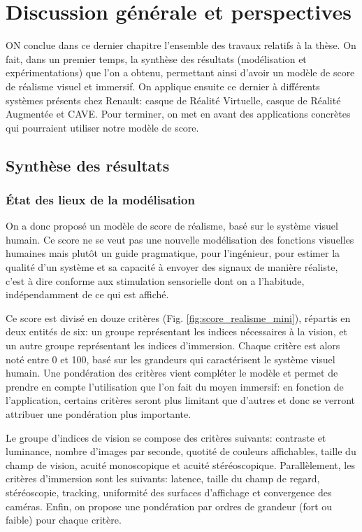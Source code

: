 \chapter*{Discussion générale et perspectives}

\lettrine[lines=3]{O}{N} conclue dans ce dernier chapitre l'ensemble des travaux relatifs à la thèse. On fait, dans un premier temps, la synthèse des résultats (modélisation et expérimentations) que l'on a obtenu, permettant ainsi d'avoir un modèle de score de réalisme visuel et immersif. On applique ensuite ce dernier à différents systèmes présents chez Renault: casque de Réalité Virtuelle, casque de Réalité Augmentée et CAVE. Pour terminer, on met en avant des applications concrètes qui pourraient utiliser notre modèle de score.

\section*{Synthèse des résultats}
	\subsection*{État des lieux de la modélisation}
	\par On a donc proposé un modèle de score de réalisme, basé sur le système visuel humain. Ce score ne se veut pas une nouvelle modélisation des fonctions visuelles humaines mais plutôt un guide pragmatique, pour l'ingénieur, pour estimer la qualité d'un système et sa capacité à envoyer des signaux de manière réaliste, c'est à dire conforme aux stimulation sensorielle dont on a l'habitude, indépendamment de ce qui est affiché.
	
	\par Ce score est divisé en douze critères (Fig. \ref{fig:score_realisme_mini}), répartis en deux entités de six: un groupe représentant les indices nécessaires à la vision, et un autre groupe représentant les indices d'immersion. Chaque critère est alors noté entre 0 et 100, basé sur les grandeurs qui caractérisent le système visuel humain. Une pondération des critères vient compléter le modèle et permet de prendre en compte l'utilisation que l'on fait du moyen immersif: en fonction de l'application, certains critères seront plus limitant que d'autres et donc se verront attribuer une pondération plus importante.
	
	\par Le groupe d'indices de vision se compose des critères suivants: contraste et luminance, nombre d'images par seconde, quotité de couleurs affichables, taille du champ de vision, acuité monoscopique et acuité stéréoscopique. Parallèlement, les critères d'immersion sont les suivants: latence, taille du champ de regard, stéréoscopie, tracking, uniformité des surfaces d'affichage et convergence des caméras. Enfin, on propose une pondération par ordres de grandeur (fort ou faible) pour chaque critère.
	

